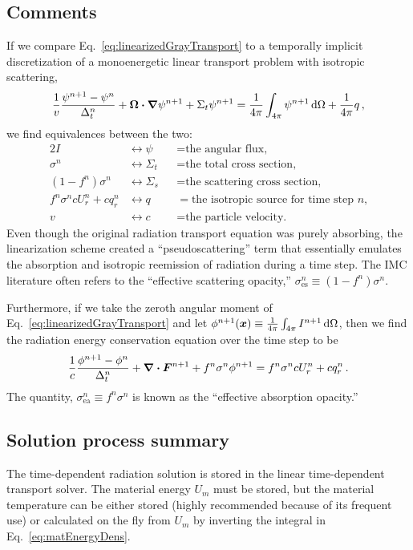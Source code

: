 \subsection{Comments}\label{sec:trtLinearizedComments}
If we compare Eq.~\eqref{eq:linearizedGrayTransport} to a temporally implicit
discretization of a monoenergetic linear transport problem with isotropic
scattering,
\begin{equation*}
  \frac{1}{v} \frac{\psi^{n+1} - \psi^n}{\Delta_t^n} 
  + \bm{\Omega} \bm{\cdot} \bm{\nabla} \psi^{n+1}
 + \Sigma_t \psi^{n+1}
 = \frac{1}{4\pi} \int_{4\pi} \psi^{n+1}\mathop{}\!\mathrm{d} \Omega
  + \frac{1}{4\pi} q \,,
\end{equation*}
we find equivalences between the two:
\begin{alignat*}{2}
  I &\leftrightarrow \psi &&= \text{the angular flux,}
  \\
  \sigma^n &\leftrightarrow \Sigma_t &&= \text{the total cross section,}
  \\
  \left(1 - f^n\right) \sigma^n &\leftrightarrow \Sigma_s &&= \text{the scattering cross
  section,} 
  \\
  f^n \sigma^n c U_r^n + c q_r^n &\leftrightarrow q &&= \text{the isotropic source for time
  step $n$,}
  \\
  v   &\leftrightarrow c &&= \text{the particle velocity.}
\end{alignat*}
Even though the original radiation transport equation was purely
absorbing, the linearization scheme created a ``pseudoscattering''
term that essentially emulates the absorption and isotropic reemission of
radiation during a time step. The IMC literature often refers to the
``effective scattering opacity,''
$\sigma_\text{es}^n \equiv \left(1 - f^n\right) \sigma^n$.

Furthermore, if we take the zeroth angular moment of
Eq.~\eqref{eq:linearizedGrayTransport} and let $\phi^{n+1}(\bm{x}) \equiv
\frac{1}{4\pi} \int_{4\pi} I^{n+1}\mathop{}\!\mathrm{d} \Omega$, then we find the radiation
energy conservation equation over the time step to be
\begin{equation}\label{eq:semiImplicitZeroth}
  \frac{1}{c} \frac{\phi^{n+1} - \phi^n}{\Delta_t^n}
  + \bm{\nabla} \bm{\cdot} \bm{F}^{n+1} + f^n\sigma^n \phi^{n+1}
 =  f^n \sigma^n c U_r^n + c q_r^n\,.
\end{equation}
The quantity, $\sigma_\text{ea}^n \equiv f^n\sigma^n$ is known as the
``effective absorption opacity.''

\subsection{Solution process summary}
The time-dependent radiation solution is stored in the linear time-dependent
transport solver. The material energy $U_m$ must be stored, but the
material temperature can be either stored (highly recommended because of its
frequent use) or calculated on the fly from $U_m$ by inverting the integral in
Eq.~\eqref{eq:matEnergyDens}.

